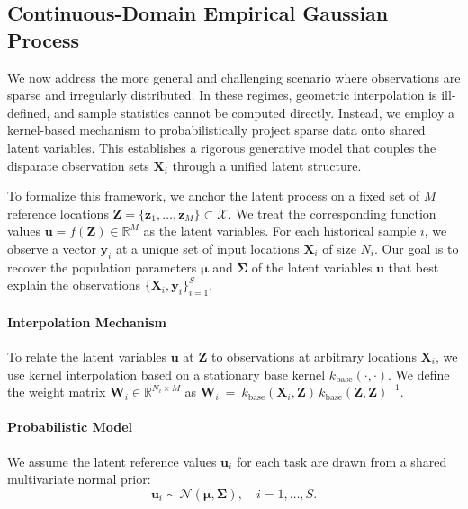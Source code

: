 \documentclass{article}
\newcommand{\K}{S}
\begin{document}
\subsection{Continuous-Domain Empirical Gaussian Process}
\label{subsec:egps:em}

We now address the more general and challenging scenario where observations are sparse and irregularly distributed. In these regimes, geometric interpolation is ill-defined, and sample statistics cannot be computed directly.
Instead, we employ a kernel-based mechanism to probabilistically project sparse data onto shared latent variables. This establishes a rigorous generative model that couples the disparate observation sets $\mathbf{X}_i$ through a unified latent structure.

To formalize this framework, we anchor the latent process on a fixed set of $M$ reference locations $\mathbf{Z} = \{\mathbf{z}_1, \ldots, \mathbf{z}_M\} \subset \mathcal{X}$.
We treat the corresponding function values $\mathbf{u} = f(\mathbf{Z}) \in \mathbb{R}^M$ as the latent variables.
For each historical sample $i$, we observe a vector $\mathbf{y}_i$ at a unique set of input locations $\mathbf{X}_i$ of size $N_i$. Our goal is to recover the population parameters $\boldsymbol{\mu}$ and $\boldsymbol{\Sigma}$ of the latent variables $\mathbf{u}$ that best explain the observations $\{\mathbf{X}_i, \mathbf{y}_i\}_{i=1}^{\K}$.

\paragraph{Interpolation Mechanism}
To relate the latent variables $\mathbf{u}$ at $\mathbf{Z}$ to observations at arbitrary locations $\mathbf{X}_i$, we use kernel interpolation based on a stationary base kernel $k_{\text{base}}(\cdot, \cdot)$. We define the weight matrix $\mathbf{W}_i \in \mathbb{R}^{N_i \times M}$ as
$\mathbf{W}_i~=~k_{\text{base}}(\mathbf{X}_i, \mathbf{Z}) \, k_{\text{base}}(\mathbf{Z}, \mathbf{Z})^{-1}$.

\paragraph{Probabilistic Model}
We assume the latent reference values $\mathbf{u}_i$ for each task are drawn from a shared multivariate normal prior:
\begin{equation}
\nonumber
    \mathbf{u}_i \sim \mathcal{N}(\boldsymbol{\mu}, \boldsymbol{\Sigma}), \quad i = 1, \ldots, \K.
\end{equation}
\end{document}
